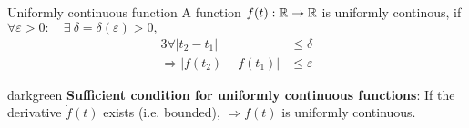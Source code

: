 \begin{definition}{Uniformly continuous function}
A function $f(t): \mathbb{R} \rightarrow \mathbb{R}$ 
is uniformly continous, if\\
$\forall \varepsilon>0:
    \quad \exists~ \delta = \delta(\varepsilon) >0,$
\begin{alignat*}{3}
\forall |t_2 - t_1| &\leq \delta\\
\Rightarrow |  f(t_2) - f(t_1) | &\leq \varepsilon
\end{alignat*}
\end{definition}

\begin{conclusion}{darkgreen}
\textbf{Sufficient condition for uniformly continuous functions}:
If the derivative $\dot{f}(t)$ exists (i.e. bounded),
$\Rightarrow f(t)$ is uniformly continuous.
\end{conclusion}~

